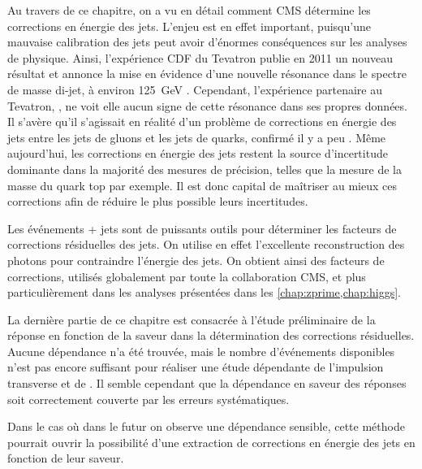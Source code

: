 Au travers de ce chapitre, on a vu en détail comment CMS détermine les corrections en énergie des jets. L'enjeu est en effet important, puisqu'une mauvaise calibration des jets peut avoir d'énormes conséquences sur les analyses de physique. Ainsi, l'expérience CDF du Tevatron publie en 2011 un nouveau résultat et annonce la mise en évidence d'une nouvelle résonance dans le spectre de masse di-jet, à environ \SI{125}{\GeV} \citep{CDF_old}. Cependant, l'expérience partenaire au Tevatron, \dzero, ne voit elle aucun signe de cette résonance dans ses propres données. Il s'avère qu'il s'agissait en réalité d'un problème de corrections en énergie des jets entre les jets de gluons et les jets de quarks, confirmé il y a peu \citep{CDF_new}. Même aujourd'hui, les corrections en énergie des jets restent la source d'incertitude dominante dans la majorité des mesures de précision, telles que la mesure de la masse du quark top par exemple. Il est donc capital de maîtriser au mieux ces corrections afin de réduire le plus possible leurs incertitudes.

\bigskip

Les événements \Pphoton + jets sont de puissants outils pour déterminer les facteurs de corrections résiduelles des jets. On utilise en effet l'excellente reconstruction des photons pour contraindre l'énergie des jets. On obtient ainsi des facteurs de corrections, utilisés globalement par toute la collaboration CMS, et plus particulièrement dans les analyses présentées dans les \cref{chap:zprime,chap:higgs}.

\bigskip

La dernière partie de ce chapitre est consacrée à l'étude préliminaire de la réponse en fonction de la saveur dans la détermination des corrections résiduelles. Aucune dépendance n'a été trouvée, mais le nombre d'événements disponibles n'est pas encore suffisant pour réaliser une étude dépendante de l'impulsion transverse et de \aeta. Il semble cependant que la dépendance en saveur des réponses soit correctement couverte par les erreurs systématiques.

Dans le cas où dans le futur on observe une dépendance sensible, cette méthode pourrait ouvrir la possibilité d'une extraction de corrections en énergie des jets en fonction de leur saveur.